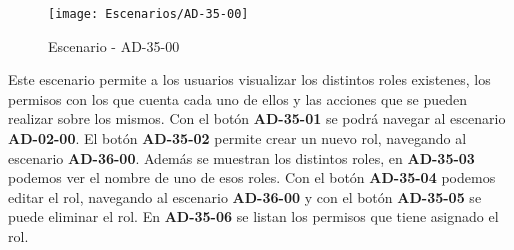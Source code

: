 \begin{figure}[H]
\centering
\texttt{[image: Escenarios/AD-35-00]}
\caption{Escenario - AD-35-00}
\label{fig:AD-35-00}
\end{figure}

Este escenario permite a los usuarios visualizar los distintos roles existenes, los permisos con los que cuenta cada uno de ellos y las acciones que se pueden realizar sobre los mismos.
Con el botón \textbf{AD-35-01} se podrá navegar al escenario \textbf{AD-02-00}. El botón \textbf{AD-35-02} permite crear un nuevo rol, navegando al escenario \textbf{AD-36-00}. Además se muestran los distintos roles, en \textbf{AD-35-03} podemos ver el nombre de uno de esos roles. Con el botón \textbf{AD-35-04} podemos editar el rol, navegando al escenario \textbf{AD-36-00} y con el botón \textbf{AD-35-05} se puede eliminar el rol. En \textbf{AD-35-06} se listan los permisos que tiene asignado el rol.
\\